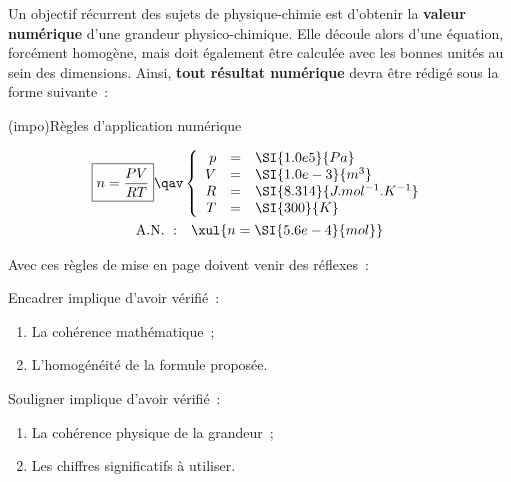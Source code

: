 \documentclass[../../main/main.tex]{subfiles}
\begin{document}
Un objectif récurrent des sujets de physique-chimie est d'obtenir la
\textbf{valeur numérique} d'une grandeur physico-chimique. Elle découle alors
d'une équation, forcément homogène, mais doit également être calculée avec les
bonnes unités au sein des dimensions. Ainsi, \textbf{tout résultat numérique}
devra être rédigé sous la forme suivante~:
\begin{tcb*}(impo){Règles d'application numérique}
	\vspace*{-10pt}
	\begin{minipage}{0.45\linewidth}
		\begin{gather*}
			\boxed{n = \frac{PV}{RT}}
			\qav
			\left\{
			\begin{array}{rcl}
				p & = & \SI{1.0e5}{Pa}                \\
				V & = & \SI{1.0e-3}{m^3}              \\
				R & = & \SI{8.314}{J.mol^{-1}.K^{-1}} \\
				T & = & \SI{300}{K}
			\end{array}
			\right.\\
			\mathrm{A.N.~:}\quad
			\xul{n = \SI{5.6e-4}{mol}}
		\end{gather*}
	\end{minipage}
	\hfill
	\smallbreak
	Avec ces règles de mise en page doivent venir des réflexes~:
	\smallbreak
	\begin{isd}
		Encadrer implique d'avoir vérifié~:
		\begin{enumerate}
			\item La cohérence mathématique~;
			\item L'homogénéité de la formule proposée.
		\end{enumerate}
		\tcblower
		Souligner implique d'avoir vérifié~:
		\begin{enumerate}
			\item La cohérence physique de la grandeur~;
			\item Les chiffres significatifs à utiliser.
		\end{enumerate}
	\end{isd}
\end{tcb*}
\end{document}

